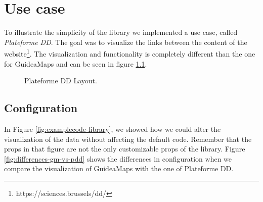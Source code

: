 \chapter{Use case}\label{ch:usecase}
To illustrate the simplicity of the library we implemented a use case, called \textit{Plateforme DD}. The goal was to visualize the links between the content of the website\footnote{https://sciences.brussels/dd/}. The visualization and functionality is completely different than the one for GuideaMaps and can be seen in figure \ref{fig:plateforme-dd}.\\

\begin{figure}[H]
	\centering
	\caption{Plateforme DD Layout.}
	\label{fig:plateforme-dd}
\end{figure}



\section{Configuration}\label{sec:usecase-configuration}
In Figure \ref{fig:examplecode-library}, we showed how we could alter the visualization of the data without affecting the default code. Remember that the props in that figure are not the only customizable props of the library. Figure \ref{fig:differences-gm-vs-pdd} shows the differences in configuration when we compare the visualization of GuideaMaps with the one of Plateforme DD.

